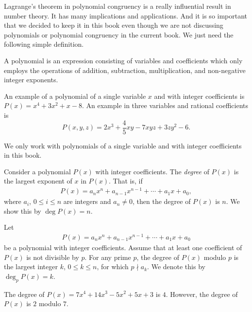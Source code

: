 \documentclass[12pt]{subfile}
\begin{document}
	Lagrange's theorem in polynomial congruency is a really influential result in number theory. It has many implications and applications. And it is so important that we decided to keep it in this book even though we are not discussing polynomials or polynomial congruency in the current book. We just need the following simple definition.
	
		\begin{definition}
			A polynomial is an expression consisting of variables and coefficients which only employs the operations of addition, subtraction, multiplication, and non-negative integer exponents.
		\end{definition}
		
		\begin{example}
			An example of a polynomial of a single variable $x$ and with integer coefficients is $P(x)=x^4+3x^2 + x -8$. An example in three variables and rational coefficients is $$P(x,y,z)=2x^3 + \frac{4}{5}xy- 7xyz + 3zy^2 - 6.$$
		\end{example}
		
		\begin{note}
			We only work with polynomials of a single variable and with integer coefficients in this book.
		\end{note}
	
		\begin{definition}
			Consider a polynomial $P(x)$ with integer coefficients. The \textit{degree} of $P(x)$ is the largest exponent of $x$ in $P(x)$. That is, if
				\begin{align*}
					P(x)=a_nx^n + a_{n-1}x^{n-1} + \cdots + a_1 x +a_0,
				\end{align*}
			 where $a_i$, $0 \leq i \leq n$ are integers and $a_n \neq 0$, then the degree of $P(x)$ is $n$. We show this by $\deg P(x)=n$.
		\end{definition}
		
		\begin{definition}
			Let 
				\begin{align*}
					P(x)=a_nx^n + a_{n-1}x^{n-1} + \cdots + a_1 x +a_0
				\end{align*}
			be a polynomial with integer coefficients. Assume that at least one coefficient of $P(x)$ is not divisible by $p$. For any prime $p$, the degree of $P(x)$ modulo $p$ is the largest integer $k$, $0 \leq k \leq n$,  for which $p \nmid a_k$. We denote this by $\deg_p P(x)=k$.
		\end{definition}
		
		\begin{example}
			The degree of $P(x)=7x^4 + 14x^3 - 5x^2 + 5x + 3$ is $4$. However, the degree of $P(x)$ is $2$ modulo $7$.
		\end{example}
		
\end{document}
